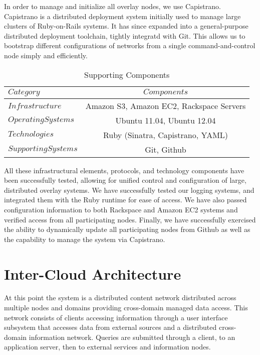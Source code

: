 In order to manage and initialize all overlay nodes, we use Capistrano.  Capistrano is a distributed deployment system initially used to manage large clusters of Ruby-on-Rails systems.  It has since expanded into a general-purpose distributed deployment toolchain, tightly integratd with Git.  This allows us to bootstrap different configurations of networks from a single command-and-control node simply and efficiently.

\begin{table*}[tp] %
\centering %
\begin{tabular}{lc}
\toprule %
$Category$ 				& $Components$ 								\\\toprule %
$Infrastructure$ 		& Amazon S3, Amazon EC2, Rackspace Servers 	\\\midrule
$Operating Systems$		& Ubuntu 11.04, Ubuntu 12.04 				\\\midrule
$Technologies$			& Ruby (Sinatra, Capistrano, YAML) 			\\\midrule
$Supporting Systems$		& Git, Github 								\\\bottomrule
\end{tabular}
\caption{Supporting Components}
\label{table:model:components}
\end{table*}

All these infrastructural elements, protocols, and technology components have been successfully tested, allowing for unified control and configuration of large, distributed overlay systems.  We have successfully tested our logging systems, and integrated them with the Ruby runtime for ease of access.  We have also passed configuration information to both Rackspace and Amazon EC2 systems and verified access from all participating nodes.  Finally, we have successfully exercised the ability to dynamically update all participating nodes from Github as well as the capability to manage the system via Capistrano.

\section{Inter-Cloud Architecture}
At this point the system is a distributed content network distributed across multiple nodes and domains providing cross-domain managed data access.  This network consists of clients accessing information through a user interface subsystem that accesses data from external sources and a distributed cross-domain information network.  Queries are submitted through a client, to an application server, then to external services and information nodes.

